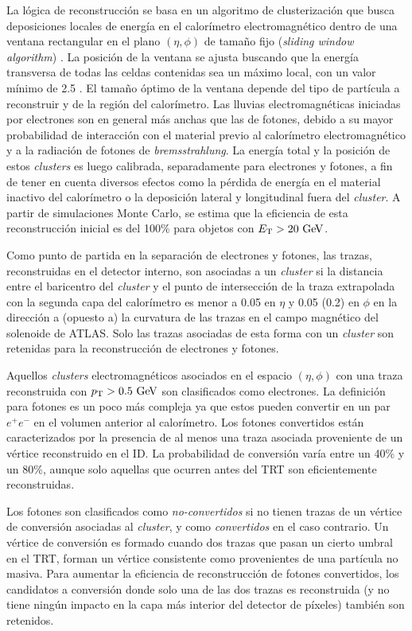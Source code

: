 La lógica de reconstrucción se basa en un algoritmo de clusterización que busca
deposiciones locales de energía en el calorímetro electromagnético dentro de una
ventana rectangular en el plano $(\eta, \phi)$ de tamaño fijo (\emph{sliding
  window algorithm}) \cite{Delmastro:1747242}. La posición de la ventana se
ajusta buscando que la energía transversa de todas las celdas contenidas sea un
máximo local, con un valor mínimo de 2.5 \gev. El tamaño óptimo de la ventana depende
del tipo de partícula a reconstruir y de la región del calorímetro. Las lluvias
electromagnéticas iniciadas por electrones son en general más anchas que las de
fotones, debido a su mayor probabilidad de interacción con el material previo al
calorímetro electromagnético y a la radiación de fotones de \emph{bremsstrahlung}. La
energía total y la posición de estos \emph{clusters} es luego calibrada, separadamente
para electrones y fotones, a fin de tener en cuenta diversos efectos como la
pérdida de energía en el material inactivo del calorímetro o la deposición
lateral y longitudinal fuera del \emph{cluster}. A partir de simulaciones Monte Carlo,
se estima que la eficiencia de esta reconstrucción inicial es del 100\% para
objetos con $\et > 20 \gev$.

Como punto de partida en la separación de electrones y fotones, las trazas,
reconstruidas en el detector interno, son asociadas a un \emph{cluster} si la distancia
entre el baricentro del \emph{cluster} y el punto de intersección de la traza
extrapolada con la segunda capa del calorímetro es menor a 0.05 en $\eta$ y 0.05
(0.2) en $\phi$ en la dirección a (opuesto a) la curvatura de las trazas en el
campo magnético del solenoide de ATLAS. Solo las trazas asociadas de esta forma
con un \emph{cluster} son retenidas para la reconstrucción de electrones y fotones.

Aquellos \emph{clusters} electromagnéticos asociados en el espacio $(\eta,\phi)$ con
una traza reconstruida con $\pt > 0.5 \gev$ son clasificados como electrones. La
definición para fotones es un poco más compleja ya que estos pueden convertir en
un par $e^+e^-$ en el volumen anterior al calorímetro. Los fotones convertidos
están caracterizados por la presencia de al menos una traza asociada proveniente
de un vértice reconstruido en el ID. La probabilidad de conversión varía entre
un 40\% y un 80\%, aunque solo aquellas que ocurren antes del TRT son
eficientemente reconstruidas.

Los fotones son clasificados como \emph{no-convertidos} si no tienen trazas de
un vértice de conversión asociadas al \emph{cluster}, y como \emph{convertidos} en el
caso contrario. Un vértice de conversión es formado cuando dos trazas que pasan
un cierto umbral en el TRT, forman un vértice consistente como provenientes de
una partícula no masiva. Para aumentar la eficiencia de reconstrucción de
fotones convertidos, los candidatos a conversión donde solo una de las dos
trazas es reconstruida (y no tiene ningún impacto en la capa más interior del
detector de píxeles) también son retenidos.

